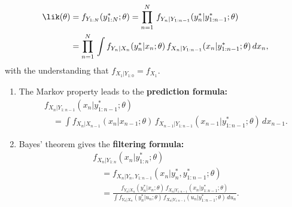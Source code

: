 \documentclass[
  letterpaper,
  DIV=11,
  numbers=noendperiod]{scrartcl}
\begin{document}
\[
  \begin{aligned}
    \lik(\theta)&=f_{Y_{1:N}}(y^*_{1:N}; \theta) =\prod_{n=1}^N\,f_{Y_n|Y_{1:n-1}}(y^*_n|y^*_{1:n-1};\theta)\\
    &=\prod_{n=1}^N\,\int f_{Y_n|X_n}(y^*_n|x_n;\theta)\,f_{X_n|Y_{1:n-1}}(x_n|y^*_{1:n-1};\theta)\, dx_{n},
  \end{aligned}
\] with the understanding that \(f_{X_1|Y_{1:0}}=f_{X_1}\).

\framebreak

\begin{enumerate}
\def\labelenumi{\arabic{enumi}.}
\setcounter{enumi}{1}
\item
  The Markov property leads to the \textbf{prediction formula:} \[
    \begin{aligned}
     &f_{X_n|Y_{1:n-1}}(x_n|y^*_{1:n-1}; \theta) \\
     &\quad = \int \! f_{X_n|X_{n-1}}(x_n|x_{n-1};\theta)\, f_{X_{n-1}|Y_{1:n-1}}(x_{n-1}| y^*_{1:n-1}; \theta) \, dx_{n-1}.
    \end{aligned}
  \]
\item
  Bayes' theorem gives the \textbf{filtering formula:} \[
   \begin{aligned}
       &f_{X_n|Y_{1:n}}(x_n|y^*_{1:n}; \theta)\\
       &\quad = f_{X_n|Y_n,Y_{1:n-1}}(x_n|y^*_n,y^*_{1:n-1}; \theta) \\
       &\quad =\frac{f_{Y_n|X_n}(y^*_{n}|x_{n};\theta)\,f_{X_n|Y_{1:n-1}}(x_{n}|y^*_{1:n-1};\theta)}{\int f_{Y_n|X_n}(y^*_{n}|u_{n};\theta)\,f_{X_n|Y_{1:n-1}}(u_{n}|y^*_{1:n-1};\theta)\, du_n}.
   \end{aligned}
  \]
\end{enumerate}

\framebreak
\end{document}

